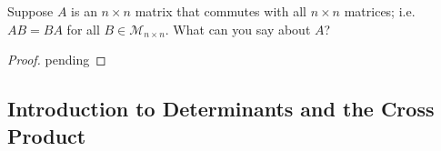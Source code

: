 \begin{exercise} \label{e1.4.37}
    Suppose \( A \) is an \( n \times n \) matrix that commutes with all \( n \times n \) matrices; i.e. \( AB = BA \) for all \( B \in \mathcal{M}_{n \times n} \). What can you say about \( A \)?
    
    \begin{proof}
        pending
    \end{proof}
\end{exercise} %

\subsection{Introduction to Determinants and the Cross Product}